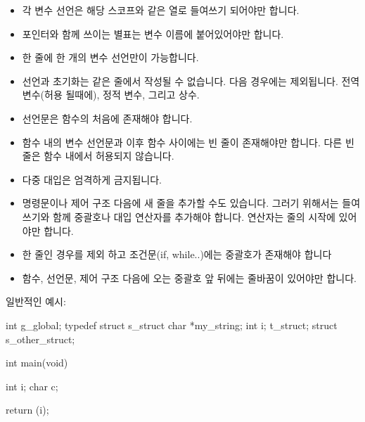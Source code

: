 \documentclass{42-ko}
\begin{document}
\begin{itemize}
                \item 각 변수 선언은 해당 스코프와 같은 열로 들여쓰기 되어야만 합니다.

                \item 포인터와 함께 쓰이는 별표는 변수 이름에 붙어있어야만 합니다.

                \item 한 줄에 한 개의 변수 선언만이 가능합니다.

                \item 선언과 초기화는 같은 줄에서 작성될 수 없습니다.
                  다음 경우에는 제외됩니다.
                  전역 변수(허용 될때에), 정적 변수, 그리고 상수.

                \item 선언문은 함수의 처음에 존재해야 합니다.

                \item 함수 내의 변수 선언문과 이후 함수 사이에는 빈 줄이
                  존재해야만 합니다. 다른 빈 줄은 함수 내에서 허용되지 않습니다.

                \item 다중 대입은 엄격하게 금지됩니다.

                \item 명령문이나 제어 구조 다음에 새 줄을 추가할 수도 있습니다.
                  그러기 위해서는 들여쓰기와 함께 중괄호나 대입 연산자를
                  추가해야 합니다. 연산자는 줄의 시작에 있어야만 합니다.

                \item 한 줄인 경우를 제외 하고 조건문(if, while..)에는
                  중괄호가 존재해야 합니다

                \item 함수, 선언문, 제어 구조 다음에 오는 중괄호 앞 뒤에는
                  줄바꿈이 있어야만 합니다.
            \end{itemize}

            \newpage

            일반적인 예시:
            \begin{42ccode}
int             g_global;
typedef struct  s_struct
{
    char    *my_string;
    int     i;
}               t_struct;
struct          s_other_struct;

int     main(void)
{
    int     i;
    char    c;

    return (i);
}
            \end{42ccode}
            \newpage
\end{document}
